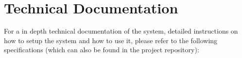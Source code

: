 \documentclass{article}
\begin{document}
\newpage
\section{Technical Documentation}
For a in depth technical documentation of the system, detailed 
instructions on how to setup the system and how to use it, please refer to the following specifications
(which can also be found in the project repository):



\end{document}
